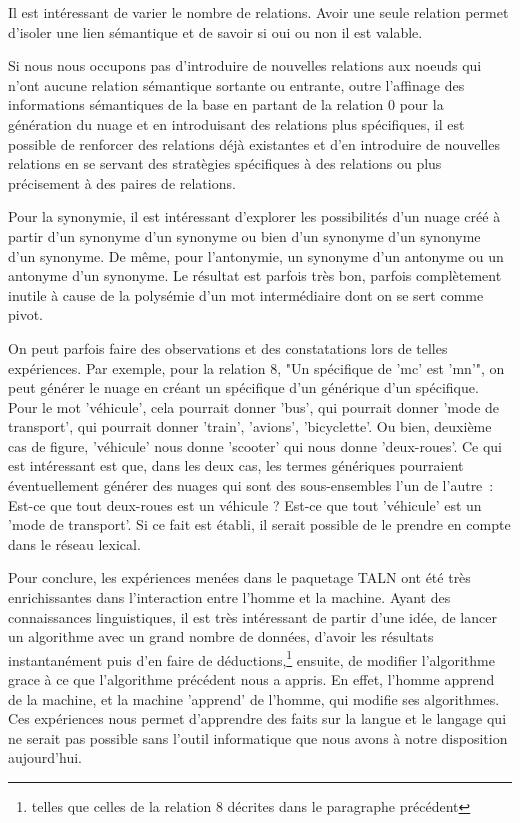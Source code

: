 \documentclass[a4paper,11pt,french]{article}
\begin{document}
Il est intéressant de varier le nombre de relations. Avoir une seule relation permet d'isoler une lien sémantique et de savoir si oui ou non il est valable. 
 
Si nous nous occupons pas d'introduire de nouvelles relations aux noeuds qui n'ont aucune relation sémantique sortante ou entrante, outre l'affinage des informations sémantiques de la base en partant de la relation 0 pour la génération du nuage et en introduisant des relations plus spécifiques, il est possible de renforcer des relations déjà existantes et d'en introduire de nouvelles relations en se servant des stratègies spécifiques à des relations ou plus précisement à des paires de relations.

Pour la synonymie, il est intéressant d'explorer les possibilités d'un nuage créé à partir d'un synonyme d'un synonyme ou bien d'un synonyme d'un synonyme d'un synonyme. De même, pour l'antonymie, un synonyme d'un antonyme ou un antonyme d'un synonyme. Le résultat est parfois très bon, parfois complètement inutile à cause de la polysémie d'un mot intermédiaire dont on se sert comme pivot.

On peut parfois faire des observations et des constatations lors de telles expériences. Par exemple, pour la relation 8, "Un spécifique de 'mc' est 'mn'", on peut générer le nuage en créant un spécifique d'un générique d'un spécifique. Pour le mot 'véhicule', cela pourrait donner 'bus', qui pourrait donner 'mode de transport', qui pourrait donner 'train', 'avions', 'bicyclette'. Ou bien, deuxième cas de figure, 'véhicule' nous donne 'scooter' qui nous donne 'deux-roues'. Ce qui est intéressant est que, dans les deux cas, les termes génériques pourraient éventuellement générer des nuages qui sont des sous-ensembles l'un de l'autre~: Est-ce que tout deux-roues est un véhicule ? Est-ce que tout 'véhicule' est un 'mode de transport'. Si ce fait est établi, il serait possible de le prendre en compte dans le réseau lexical. 

Pour conclure, les expériences menées dans le paquetage TALN ont été très enrichissantes dans l'interaction entre l'homme et la machine. Ayant des connaissances linguistiques, il est très intéressant de partir d'une idée, de lancer un algorithme avec un grand nombre de données, d'avoir les résultats instantanément puis d'en faire de déductions,\footnote{telles que celles de la relation 8 décrites dans le paragraphe précédent} ensuite, de modifier l'algorithme grace à ce que l'algorithme précédent nous a appris. En effet, l'homme apprend de la machine, et la machine 'apprend' de l'homme, qui modifie ses algorithmes. Ces expériences nous permet d'apprendre des faits sur la langue et le langage qui ne serait pas possible sans l'outil informatique que nous avons à notre disposition aujourd'hui.  
\end{document}
